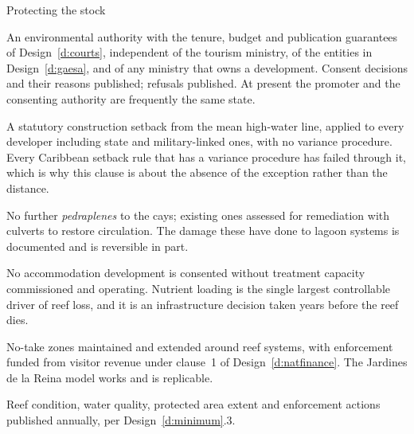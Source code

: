 \begin{design}{Protecting the stock}
\label{d:protect}
\begin{rules}
 An environmental authority with the tenure,
budget and publication guarantees of Design~\ref{d:courts}, independent of the
tourism ministry, of the entities in Design~\ref{d:gaesa}, and of any ministry
that owns a development. Consent decisions and their reasons published; refusals
published. At present the promoter and the consenting authority are frequently
the same state.

 A statutory construction setback from
the mean high-water line, applied to every developer including state and
military-linked ones, with no variance procedure. Every Caribbean setback rule
that has a variance procedure has failed through it, which is why this clause is
about the absence of the exception rather than the distance.

 No further \emph{pedraplenes} to the cays; existing ones
assessed for remediation with culverts to restore circulation. The damage these
have done to lagoon systems is documented and is reversible in part.

 No accommodation development is consented without
treatment capacity commissioned and operating. Nutrient loading is the single
largest controllable driver of reef loss, and it is an infrastructure decision
taken years before the reef dies.

 No-take zones maintained and extended around reef systems, with
enforcement funded from visitor revenue under clause~1 of
Design~\ref{d:natfinance}. The Jardines de la Reina model works and is
replicable.

 Reef condition, water quality, protected
area extent and enforcement actions published annually, per
Design~\ref{d:minimum}.3.
\end{rules}
\end{design}


